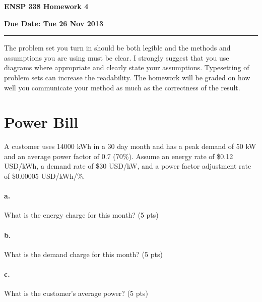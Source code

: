 \documentclass{article}
\newif\ifsolution
\newcommand{\chead}[1]
{\begin{center}\large\textbf{#1}\end{center}}
\newcommand{\solution}[1]
{\ifsolution
\vspace{10pt}
{\color{answer-color} #1}
\else\fi}
\begin{document}
\chead{ENSP 338 Homework 4}
\chead{Due Date:  Tue 26 Nov 2013}
\hrule
\vspace{10pt}

The problem set you turn in should be both legible and the methods and
assumptions you are using must be clear.  I strongly suggest that you
use diagrams where appropriate and clearly state your assumptions.
Typesetting of problem sets can increase the readability.  The homework
will be graded on how well you communicate your method as much as the
correctness of the result.


\section{Power Bill}

A customer uses 14000 kWh in a 30 day month and has a peak demand of 50 kW and an
average power factor of 0.7 (70\%).  Assume an energy rate of \$0.12 USD/kWh, a
demand rate of \$30 USD/kW, and a power factor adjustment rate of
\$0.00005 USD/kWh/\%.

\paragraph{a.} What is the energy charge for this month? (5 pts)

\solution{Energy charges are based on the electrical energy consumed
over the billing time period.
$$14000 kWh \cdot 0.12 USD/kWh = 1680 USD $$}

\paragraph{b.} What is the demand charge for this month? (5 pts)

\solution{Demand charges are based on the highest or peak level of power
consumption over the billing period.
$$ 50 kW peak \cdot 30 USD/kW peak = 1500 USD$$
}



\paragraph{c.} What is the customer's average power? (5 pts)

\solution{The total energy for the month should equal the average power
multiplied by the total time in one month, since energy equals power
multiplied by time.
$$ P_{avg} = \textrm{average power} = \frac{14000 kWh}{30 days\cdot 24
hr/day} $$
}
\end{document}
